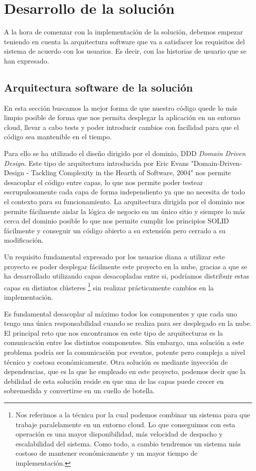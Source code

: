 \chapter{Desarrollo de la solución}
A la hora de comenzar con la implementación de la solución, debemos empezar teniendo en
cuenta la arquitectura software que va a satisfacer los requisitos del sistema de acuerdo con los
usuarios. Es decir, con las historias de usuario que se han expresado.

\section{Arquitectura software de la solución}
En esta sección buscamos la mejor forma de que nuestro código quede lo más limpio posible
de forma que nos permita desplegar la aplicación en un entorno cloud, llevar a cabo tests
y poder introducir cambios con facilidad para que el código sea mantenible en el tiempo.

Para ello se ha utilizado el diseño dirigido por el dominio, DDD \textit{Domain Driven
Design}. Este tipo de arquitectura introducida por Eric Evans \cite{ddd_book}
"Domain-Driven-Design - Tackling Complexity in the Hearth of Software, 2004" nos permite
desacoplar el código entre capas, lo que nos permite poder testear escrupulosamente cada
capa de forma independiento ya que no necesita de todo el contexto para su funcionamiento.
La arquitectura dirigida por el dominio nos permite fácilmente aislar la lógica de negocio
en un único sitio y siempre lo más cerca del dominio posible lo que nos permite cumplir
los principios \Gls{SOLID} fácilmente y conseguir un código abierto a su extensión pero
cerrado a su modificación.  


Un requisito fundamental expresado por los usuarios diana a utilizar este proyecto es
poder desplegar fácilmente este proyecto en la nube, gracias a que se ha desarrollado
utilizando capas desacopladas entre si, podríamos distribuir estas capas en distintos
clústeres \footnote{Nos referimos a la técnica por la cual podemos combinar un sistema
para que trabaje paralelamente en un entorno cloud. Lo que conseguimos con esta operación
es una mayor disponibilidad, más velocidad de despacho y escalabilidad del sistema. Como
todo, a cambio tendremos un sistema más costoso de mantener económicamente y un mayor
tiempo de implementación. } sin realizar prácticamente cambios en la implementación.  

Es fundamental desacoplar al máximo todos los componentes y que cada uno tengo una única
responsabilidad cuando se realiza para ser desplegado en la nube. El principal reto que nos
encontramos en este tipo de arquitecturas es la comunicación entre los distintos
componentes.  Sin embargo, una solución a este problema podría ser la comunicación por
eventos, potente pero compleja a nivel técnico y costosa económicamente. Otra solución es
mediante inyección de dependencias, que es la que he empleado en este proyecto, podemos
decir que la debilidad de esta solución reside en que una de las capas puede crecer en
sobremedida y convertirse en un cuello de botella.

